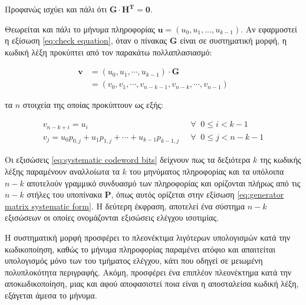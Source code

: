 \vspace{5mm}
Προφανώς ισχύει και πάλι ότι $\mathbf{G}\cdot\mathbf{H^T}=\mathbf{0}$.

Θεωρείται και πάλι το μήνυμα πληροφορίας $\mathbf{u} = (u_0, u_1, ..., u_{k-1})$. Αν εφαρμοστεί η εξίσωση \ref{eq:check equation}, όταν ο πίνακας $\mathbf{G}$ είναι σε συστηματική μορφή, η κωδική λέξη προκύπτει από τον παρακάτω πολλαπλασιασμό:

\begin{equation}
\begin{split}
\mathbf{v} & = \left( u_0, u_1, \cdots, u_{k-1} \right) \cdot \mathbf{G}\\
& = \left( v_0, v_1, \cdots, v_{n-k-1}, v_{n-k}, \cdots, v_{n-1} \right)
\end{split}
\label{eq:systematic codeword formation}
\end{equation}

\vspace{5mm}

τα $n$ στοιχεία της οποίας προκύπτουν ως εξής:

\begin{equation}
\begin{aligned}
v_{n-k+i}=u_i\;\;\ & \forall\;\;0\leq i < k-1  \\
v_j=u_0p_{0,j}+u_1p_{1,j}+\cdots+u_{k-1}p_{k-1,j}\;\; & \forall\;\;0\leq j < n-k-1
\end{aligned}
\label{eq:systematic codeword bits}
\end{equation}

\vspace{5mm}

Οι εξισώσεις \ref{eq:systematic codeword bits} δείχνουν πως τα δεξιότερα $k$  της κωδικής λέξης παραμένουν αναλλοίωτα τα $k$  του μηνύματος πληροφορίας και τα υπόλοιπα $n-k$ αποτελούν γραμμικό συνδυασμό των  πληροφορίας και ορίζονται πλήρως από τις $n-k$ στήλες του υποπίνακα $\mathbf{P}$, όπως αυτός ορίζεται στην εξίσωση \ref{eq:generator matrix systematic form}. Η δεύτερη έκφραση, αποτελεί ένα σύστημα $n-k$ εξισώσεων οι οποίες ονομάζονται εξισώσεις ελέγχου ισοτιμίας.

Η συστηματική μορφή προσφέρει το πλεονέκτιμα λιγότερων υπολογισμών κατά την κωδικοποίηση, καθώς το μήνυμα πληροφορίας παραμένει ατόφιο και 
απαιτείται υπολογισμός μόνο των  του τμήματος ελέγχου, κάτι που οδηγεί σε μειωμένη πολυπλοκότητα περιγραφής. Ακόμη, προσφέρει ένα επιπλέον πλεονέκτημα κατά την αποκωδικοποίηση, μιας και αφού αποφασιστεί ποια είναι η αποσταλείσα κωδική λέξη, εξάγεται άμεσα το μήνυμα.

